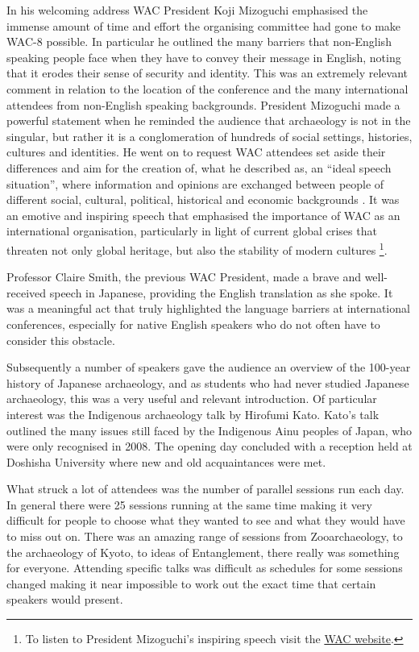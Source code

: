 \documentclass[spanish]{ijsra}
\begin{document}
In his welcoming address WAC President Koji Mizoguchi emphasised the immense amount of time and effort the organising committee had gone to make WAC-8 possible. In particular he outlined the many barriers that non-English speaking people face when they have to convey their message in English, noting that it erodes their sense of security and identity. This was an extremely relevant comment in relation to the location of the conference and the many international attendees from non-English speaking backgrounds. President Mizoguchi made a powerful statement when he reminded the audience that archaeology is not in the singular, but rather it is a conglomeration of hundreds of social settings, histories, cultures and identities. He went on to request WAC attendees set aside their differences and aim for the creation of, what he described as, an “ideal speech situation”, where information and opinions are exchanged between people of different social, cultural, political, historical and economic backgrounds \parencite{addressWAC}. It was an emotive and inspiring speech that emphasised the importance of WAC as an international organisation, particularly in light of current global crises that threaten not only global heritage, but also the stability of modern cultures \footnote{To listen to President Mizoguchi’s inspiring speech visit the \href{http://worldarch.org/blog/presidents-address-at-wac-8/}{WAC website}.}.

Professor Claire Smith, the previous WAC President, made a brave and well-received speech in Japanese, providing the English translation as she spoke. It was a meaningful act that truly highlighted the language barriers at international conferences, especially for native English speakers who do not often have to consider this obstacle. 

Subsequently a number of speakers gave the audience an overview of the 100-year history of Japanese archaeology, and as students who had never studied Japanese archaeology, this was a very useful and relevant introduction. Of particular interest was the Indigenous archaeology talk by Hirofumi Kato. Kato’s talk outlined the many issues still faced by the Indigenous Ainu peoples of Japan, who were only recognised in 2008. The opening day concluded with a reception held at Doshisha University where new and old acquaintances were met.

What struck a lot of attendees was the number of parallel sessions run each day. In general there were 25 sessions running at the same time making it very difficult for people to choose what they wanted to see and what they would have to miss out on. There was an amazing range of sessions from Zooarchaeology, to the archaeology of Kyoto, to ideas of Entanglement, there really was something for everyone. Attending specific talks was difficult as schedules for some sessions changed making it near impossible to work out the exact time that certain speakers would present.
\end{document}
